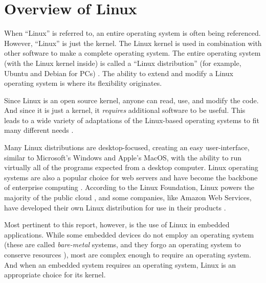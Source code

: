 \section{Overview of Linux}
\markboth{}{}
    When ``Linux'' is referred to, an entire operating system is often being
        referenced.
    However, ``Linux'' is just the kernel.
    The Linux kernel is used in combination with other software to make a
    complete operating system.
    The entire operating system (with the Linux kernel inside) is called a
        ``Linux distribution'' (for example, Ubuntu and Debian for PCs)
        \cite{stallman}.
    The ability to extend and modify a Linux operating system is where its
        flexibility originates.

    Since Linux is an open source kernel, anyone can read, use, and modify the
        code.
    And since it is just a kernel, it \textit{requires} additional software to
        be useful.
    This leads to a wide variety of adaptations of the Linux-based operating
        systems to fit many different needs \cite{comparative-os}.

    Many Linux distributions are desktop-focused, creating an easy
        user-interface, similar to Microsoft's Windows and Apple's MacOS, with
        the ability to run virtually all of the programs expected from a desktop
        computer.
    Linux operating systems are also a popular choice for web servers and have
        become the backbone of enterprise computing \cite{grandview}.
    According to the Linux Foundation, Linux powers the majority of the public
        cloud \cite{linux-public-cloud}, and some companies, like Amazon Web
        Services, have developed their own Linux distribution for use in their
        products \cite{aws-linux}.

    Most pertinent to this report, however, is the use of Linux in embedded
        applications.
    While some embedded devices do not employ an operating system (these are
        called \textit{bare-metal} systems, and they forgo an operating system
        to conserve resources \cite{bare-metal}), most are complex enough to
        require an operating system.
    And when an embedded system requires an operating system, Linux is an
        appropriate choice for its kernel.

